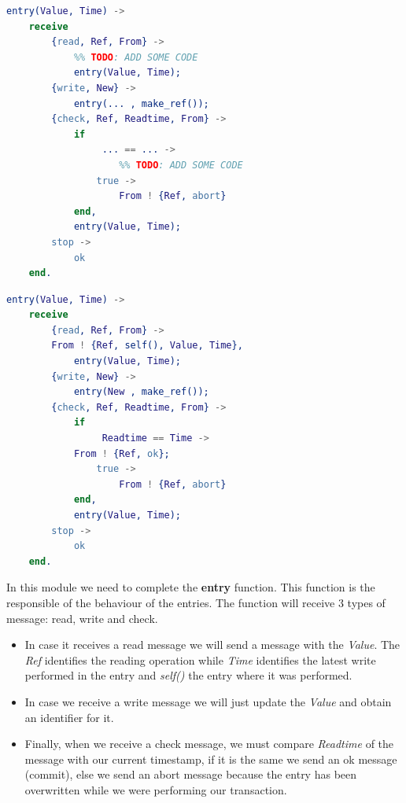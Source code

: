 \documentclass[a4paper, 10pt]{article}
\begin{document}
    \begin{minipage}{.45\textwidth}
	\begin{lstlisting}[language=erlang, caption={Template}]
entry(Value, Time) ->
    receive
        {read, Ref, From} ->
            %% TODO: ADD SOME CODE
            entry(Value, Time);
        {write, New} ->
            entry(... , make_ref()); 
        {check, Ref, Readtime, From} ->
            if 
                 ... == ... ->  
                    %% TODO: ADD SOME CODE
                true ->
                    From ! {Ref, abort}
            end,
            entry(Value, Time);
        stop ->
            ok
    end.
 	\end{lstlisting}
    \end{minipage}\hfill
    \begin{minipage}{.45\textwidth}
	\begin{lstlisting}[language=erlang, caption={Filled version}]
entry(Value, Time) ->
    receive
        {read, Ref, From} ->
	    From ! {Ref, self(), Value, Time},
            entry(Value, Time);
        {write, New} ->
            entry(New , make_ref());
        {check, Ref, Readtime, From} ->
            if 
                 Readtime == Time -> 
		    From ! {Ref, ok};
                true ->
                    From ! {Ref, abort}
            end,
            entry(Value, Time);
        stop ->
            ok
    end.
  	\end{lstlisting}
  \end{minipage}

In this module we need to complete the \textbf{entry} function. This function is the responsible of the behaviour of the entries. The function will receive 3 types of message: read, write and check. 

\begin{itemize}
    \item  In case it receives a read message we will send a message with the \textit{Value}. The \textit{Ref} identifies the reading operation while \textit{Time} identifies the latest write performed in the entry and \textit{self()} the entry where it was performed.
  \item In case we receive a write message we will just update the \textit{Value} and obtain an identifier for it. 
  \item Finally, when we receive a check message, we must compare \textit{Readtime} of the message with our current timestamp, if it is the same we send an ok message (commit), else we send an abort message because the entry has been overwritten while we were performing our transaction.
\end{itemize}
\end{document}
